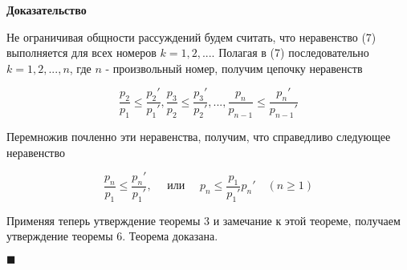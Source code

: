 \textbf{Доказательство}

Не ограничивая общности рассуждений будем считать, что неравенство (7) выполняется для всех номеров $k = 1, 2, ....$ Полагая в (7) последовательно $k = 1, 2, ..., n$, где $n$ - произвольный номер, получим цепочку неравенств

\begin{equation*}
	\frac{p_2}{p_1} \leqslant \frac{p_2'}{p_1'}, \frac{p_3}{p_2} \leqslant \frac{p_3'}{p_2'}, ..., \frac{p_n}{p_{n-1}} \leqslant \frac{p_n'}{p_{n-1}'}
\end{equation*}

Перемножив почленно эти неравенства, получим, что справедливо следующее неравенство

\begin{equation*}
	\frac{p_n}{p_1} \leqslant \frac{p_n'}{p_1'},\quad \mbox{ или }\quad p_n \leqslant \frac{p_1}{p_1'}p_n'\quad (n \geqslant 1)
\end{equation*}

Применяя теперь утверждение теоремы 3 и замечание к этой теореме, получаем утверждение теоремы 6. Теорема доказана.

\begin{flushright}
	$\blacksquare$
\end{flushright}